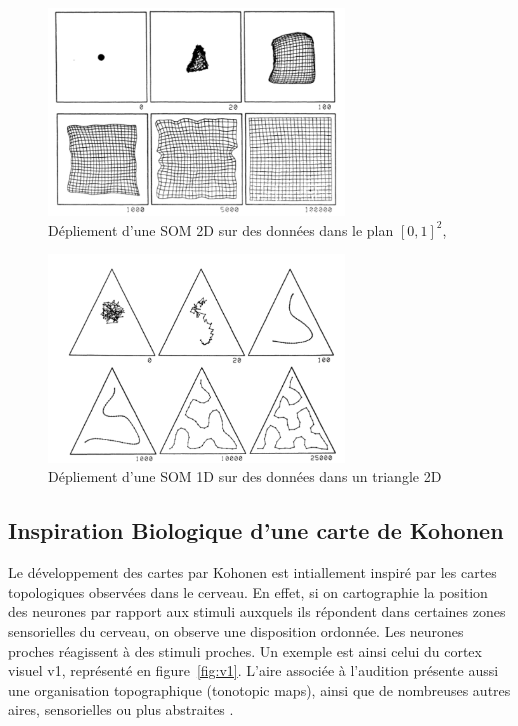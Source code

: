 \documentclass[../main]{subfiles}
\begin{document}
\begin{figure}
\centering
\includegraphics[width=0.7\textwidth]{som2d}
\caption{Dépliement d'une SOM 2D sur des données dans le plan $[0,1]^2$, \cite{Kohonen1995SelfOrganizingM} \label{fig:som2d}}

\end{figure}

\begin{figure}
\centering
\includegraphics[width=0.7\textwidth]{som1d}
\caption{Dépliement d'une SOM 1D sur des données dans un triangle 2D \cite{Kohonen1995SelfOrganizingM}\label{fig:som1d}}

\end{figure}

\subsection{Inspiration Biologique d'une carte de Kohonen}

Le développement des cartes par Kohonen est intiallement inspiré par les cartes topologiques observées dans le cerveau. En effet, si on cartographie la position des neurones par rapport aux stimuli auxquels ils répondent dans certaines zones sensorielles du cerveau, on observe une disposition ordonnée. Les neurones proches réagissent à des stimuli proches. Un exemple est ainsi celui du cortex visuel v1, représenté en figure~\ref{fig:v1}. L'aire associée à l'audition présente aussi une organisation topographique (tonotopic maps), ainsi que de nombreuses autres aires, sensorielles ou plus abstraites \cite{Kohonen1995SelfOrganizingM}.
\end{document}

